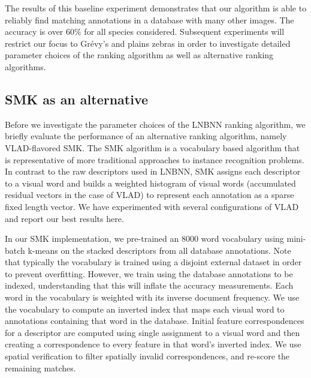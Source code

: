         The results of this baseline experiment demonstrates that our algorithm is able to reliably find matching
        annotations in a database with many other images. The accuracy is over $60\percent$ for all species
        considered. Subsequent experiments will restrict our focus to Grévy's and plains zebras in order to
        investigate detailed parameter choices of the ranking algorithm as well as alternative ranking algorithms.
      
        \BaselineExpt{}

    \FloatBarrier{}
    \subsection{SMK as an alternative}\label{sub:exptsmk}  

        Before we investigate the parameter choices of the LNBNN ranking algorithm, we briefly evaluate the
        performance of an alternative ranking algorithm, namely VLAD-flavored SMK. The SMK algorithm is a
        vocabulary based algorithm that is representative of more traditional approaches to instance recognition
        problems. In contrast to the raw descriptors used in LNBNN, SMK assigns each descriptor to a visual word
        and builds a weighted histogram of visual words (accumulated residual vectors in the case of VLAD) to
        represent each annotation as a sparse fixed length vector. We have experimented with several configurations
        of VLAD and report our best results here.

        In our SMK implementation, we pre-trained an $8000$ word vocabulary using mini-batch k-means on the stacked
        descriptors from all database annotations. Note that typically the vocabulary is trained using a disjoint
        external dataset in order to prevent overfitting. However, we \naively{} train using the database
        annotations to be indexed, understanding that this will inflate the accuracy measurements. Each word in the
        vocabulary is weighted with its inverse document frequency. We use the vocabulary to compute an inverted
        index that maps each visual word to annotations containing that word in the database. Initial feature
        correspondences for a descriptor are computed using single assignment to a visual word and then creating a
        correspondence to every feature in that word's inverted index. We use spatial verification to filter
        spatially invalid correspondences, and re-score the remaining matches.

